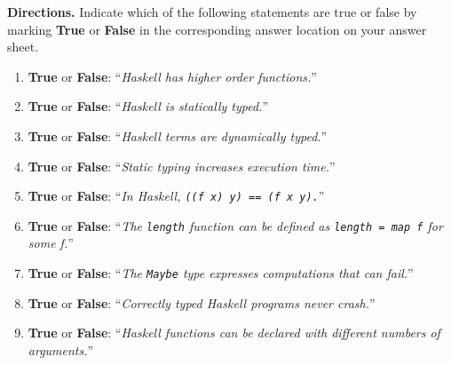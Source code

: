 \documentclass[12pt]{article}
\begin{document}
\newpage
{\bf Directions.} Indicate which of the following statements are true or false by marking {\bf True} or {\bf False} 
in the corresponding answer location on your answer sheet.
\begin{enumerate}


\vspace{5ex}
\item {\bf True} or {\bf False}: ``\emph{Haskell has higher order functions.}''
\vspace{1ex}

\item {\bf True} or {\bf False}: ``\emph{Haskell is statically typed.}''
\vspace{1ex}

\item {\bf True} or {\bf False}: ``\emph{Haskell terms are dynamically typed.}''
\vspace{1ex}

\item {\bf True} or {\bf False}: ``\emph{Static typing increases execution time.}''
\vspace{1ex}

\item {\bf True} or {\bf False}: ``\emph{In Haskell, {\tt ((f x) y) == (f x y).}}''
\vspace{1ex}

\item {\bf True} or {\bf False}: ``\emph{The {\tt length} function can be defined as {\tt length = map f} for some f.}''
\vspace{1ex}

\item {\bf True} or {\bf False}: ``\emph{The {\tt Maybe} type expresses computations that can fail.}''
\vspace{1ex}

\item {\bf True} or {\bf False}: ``\emph{Correctly typed Haskell programs never crash.}''
\vspace{1ex}

\item {\bf True} or {\bf False}: ``\emph{Haskell functions can be declared with different numbers of arguments.}''
\vspace{1ex}


\end{enumerate}
\end{document}
